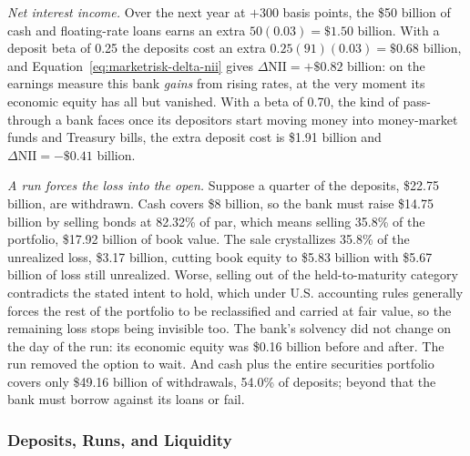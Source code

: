 \documentclass[../ai_in_finance]{subfiles}
\begin{document}
\emph{Net interest income.} Over the next year at $+300$ basis points, the \$50 billion of cash and floating-rate loans earns an extra $50(0.03) = \$1.50$ billion. With a deposit beta of 0.25 the deposits cost an extra $0.25(91)(0.03) = \$0.68$ billion, and Equation~\eqref{eq:marketrisk-delta-nii} gives $\Delta\text{NII} = +\$0.82$ billion: on the earnings measure this bank \emph{gains} from rising rates, at the very moment its economic equity has all but vanished. With a beta of 0.70, the kind of pass-through a bank faces once its depositors start moving money into money-market funds and Treasury bills, the extra deposit cost is \$1.91 billion and $\Delta\text{NII} = -\$0.41$ billion.

\emph{A run forces the loss into the open.} Suppose a quarter of the deposits, \$22.75 billion, are withdrawn. Cash covers \$8 billion, so the bank must raise \$14.75 billion by selling bonds at 82.32\% of par, which means selling 35.8\% of the portfolio, \$17.92 billion of book value. The sale crystallizes 35.8\% of the unrealized loss, \$3.17 billion, cutting book equity to \$5.83 billion with \$5.67 billion of loss still unrealized. Worse, selling out of the held-to-maturity category contradicts the stated intent to hold, which under U.S. accounting rules generally forces the rest of the portfolio to be reclassified and carried at fair value, so the remaining loss stops being invisible too. The bank's solvency did not change on the day of the run: its economic equity was \$0.16 billion before and after. The run removed the option to wait. And cash plus the entire securities portfolio covers only \$49.16 billion of withdrawals, 54.0\% of deposits; beyond that the bank must borrow against its loans or fail.

\subsubsection*{Deposits, Runs, and Liquidity}
\end{document}
